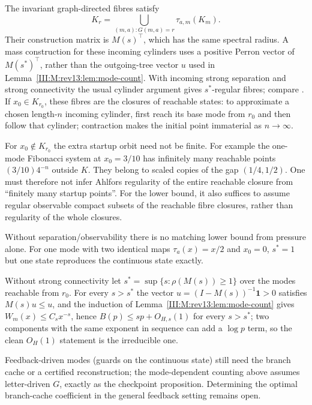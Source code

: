 \begin{remark}
The invariant graph-directed fibres satisfy
\[
 K_r=\bigcup_{(m,a):G(m,a)=r}\tau_{a,m}(K_m).
\]
Their construction matrix is $M(s)^\top$, which has the same spectral
radius. A mass construction for these incoming cylinders uses a positive
Perron vector of $M(s^\ast)^\top$, rather than the outgoing-tree vector
$u$ used in Lemma~\ref{III:M:rev13:lem:mode-count}. With incoming strong separation
and strong connectivity the usual cylinder argument gives
$s^\ast$-regular fibres; compare \citet{mauldin_williams}.
If $x_0\in K_{r_0}$, these fibres are the closures of reachable states:
to approximate a chosen length-$n$ incoming cylinder, first reach its base
mode from $r_0$ and then follow that cylinder; contraction makes the initial
point immaterial as $n\to\infty$.

For $x_0\notin K_{r_0}$ the extra startup orbit need not be finite. For
example the one-mode Fibonacci system at $x_0=3/10$ has infinitely many
reachable points $(3/10)4^{-n}$ outside $K$. They belong to scaled copies
of the gap $(1/4,1/2)$. One must therefore not infer Ahlfors regularity of
the entire reachable closure from ``finitely many startup points''.
For the lower bound, it also suffices to assume regular observable compact
subsets of the reachable fibre closures, rather than regularity of the
whole closures.

Without separation/observability there is no matching lower bound from
pressure alone. For one mode with two identical maps $\tau_a(x)=x/2$ and
$x_0=0$, $s^\ast=1$ but one state reproduces the continuous state exactly.
\end{remark}


\begin{remark}
Without strong connectivity let $s^\ast=\sup\{s:\rho(M(s))\ge1\}$ over the modes reachable
from $r_0$. For every $s>s^\ast$ the vector $u=(I-M(s))^{-1}\mathbf 1>0$ satisfies
$M(s)u\le u$, and the induction of Lemma~\ref{III:M:rev13:lem:mode-count} gives
$W_m(x)\le C_s x^{-s}$, hence $B(p)\le sp+O_{H,s}(1)$ for every $s>s^\ast$; two
components with the same exponent in sequence can add a $\log p$ term, so the clean
$O_H(1)$ statement is the irreducible one.
\end{remark}



\begin{remark}
Feedback-driven modes (guards on the continuous state) still need the branch cache or a
certified reconstruction; the mode-dependent counting above assumes letter-driven $G$,
exactly as the checkpoint proposition. Determining the optimal branch-cache coefficient in the general feedback
setting remains open.
\end{remark}


